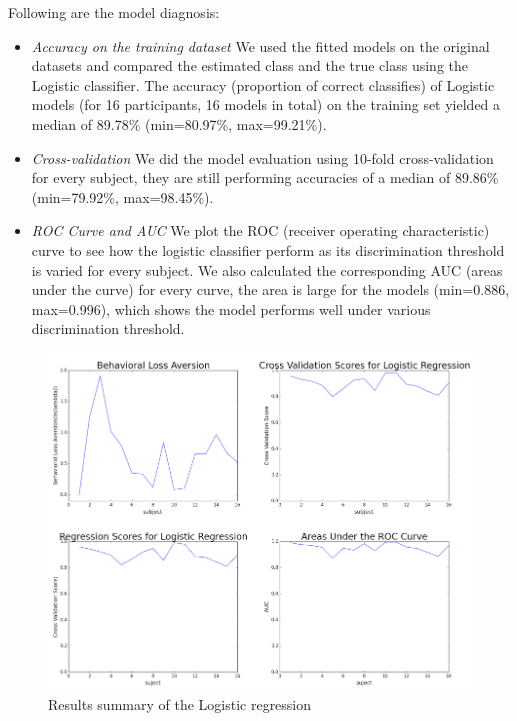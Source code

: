\documentclass[11pt]{article}
\begin{document}
Following are the model diagnosis:

\begin{itemize}
\item \emph{Accuracy on the training dataset} We used the fitted models on the 
original datasets and compared the estimated class and the true class using the 
Logistic classifier. The accuracy (proportion of correct classifies) of 
Logistic models (for 16 participants, 16 
models in total) on the training set yielded a median of 89.78\% (min=80.97\%, 
max=99.21\%).
\item \emph{Cross-validation} We did the model evaluation using 10-fold 
cross-validation for every subject, they are still performing accuracies of a 
median of 89.86\% (min=79.92\%, max=98.45\%).
\item \emph{ROC Curve and AUC} We plot the ROC (receiver operating 
characteristic) curve to see how the logistic classifier perform as its 
discrimination threshold is varied for every subject. We also calculated the 
corresponding AUC (areas under the curve) for every curve, the area is large 
for the models (min=0.886, max=0.996), which shows the model performs well 
under various discrimination threshold.

\end{itemize}

\begin{figure}[H]
    \centering
        \includegraphics[scale=0.4]{figures/Regression1/logistic_summary.png}
    \caption{Results summary of the Logistic regression}
\end{figure}
\end{document}

